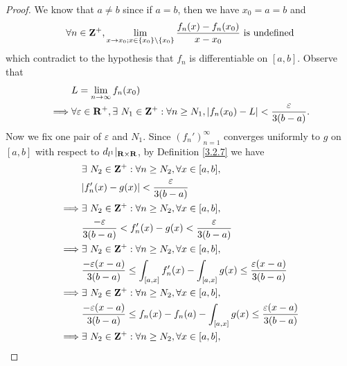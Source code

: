 \begin{proof}
    We know that \(a \neq b\) since if \(a = b\), then we have \(x_0 = a = b\) and
    \[
        \forall n \in \mathbf{Z}^+, \lim_{x \to x_0; x \in \{x_0\} \setminus \{x_0\}} \frac{f_n(x) - f_n(x_0)}{x - x_0} \text{ is undefined}
    \]
    which contradict to the hypothesis that \(f_n\) is differentiable on \([a, b]\).
    Observe that
    \begin{align*}
                 & L = \lim_{n \to \infty} f_n(x_0)                                                                                             \\
        \implies & \forall \varepsilon \in \mathbf{R}^+, \exists\ N_1 \in \mathbf{Z}^+ : \forall n \geq N_1, \left\lvert f_n(x_0) - L\right\rvert < \frac{\varepsilon}{3(b - a)}.
    \end{align*}
    Now we fix one pair of \(\varepsilon\) and \(N_1\).
    Since \((f_n')_{n = 1}^\infty\) converges uniformly to \(g\) on \([a, b]\) with respect to \(d_{l^1}|_{\mathbf{R} \times \mathbf{R}}\), by Definition \ref{3.2.7} we have
    \begin{align*}
                 & \exists\ N_2 \in \Z^+ : \forall n \geq N_2, \forall x \in [a, b],                                                               \\
                 & \abs{f_n'(x) - g(x)} < \frac{\varepsilon}{3(b - a)}                                                                             \\
        \implies & \exists\ N_2 \in \Z^+ : \forall n \geq N_2, \forall x \in [a, b],                                                               \\
                 & \frac{-\varepsilon}{3(b - a)} < f_n'(x) - g(x) < \frac{\varepsilon}{3(b - a)}                                                   \\
        \implies & \exists\ N_2 \in \Z^+ : \forall n \geq N_2, \forall x \in [a, b],                                                               \\
                 & \frac{-\varepsilon (x - a)}{3(b - a)} \leq \int_{[a, x]} f_n'(x) - \int_{[a, x]} g(x) \leq \frac{\varepsilon (x - a)}{3(b - a)} \\
        \implies & \exists\ N_2 \in \Z^+ : \forall n \geq N_2, \forall x \in [a, b],                                                               \\
                 & \frac{-\varepsilon (x - a)}{3(b - a)} \leq f_n(x) - f_n(a) - \int_{[a, x]} g(x) \leq \frac{\varepsilon (x - a)}{3(b - a)}       \\
        \implies & \exists\ N_2 \in \Z^+ : \forall n \geq N_2, \forall x \in [a, b],                                                               \\

\end{align*}
\end{proof}
